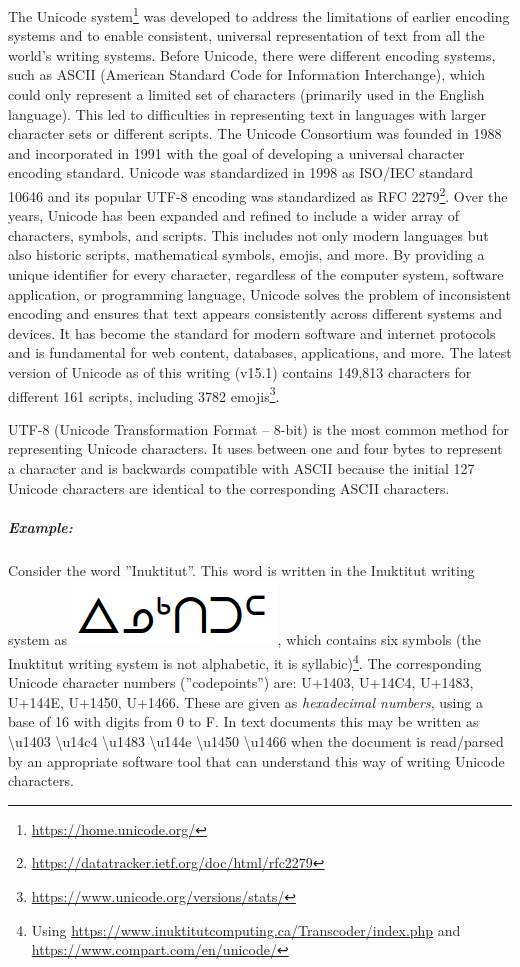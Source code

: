 The Unicode system\footnote{\url{https://home.unicode.org/}} was developed to address the limitations of earlier encoding systems and to enable consistent, universal representation of text from all the world's writing systems. Before Unicode, there were different encoding systems, such as ASCII (American Standard Code for Information Interchange), which could only represent a limited set of characters (primarily used in the English language). This led to difficulties in representing text in languages with larger character sets or different scripts. The Unicode Consortium was founded in 1988 and incorporated in 1991 with the goal of developing a universal character encoding standard. Unicode was standardized in 1998 as ISO/IEC standard 10646 and its popular UTF-8 encoding was standardized as RFC 2279\footnote{\url{https://datatracker.ietf.org/doc/html/rfc2279}}. Over the years, Unicode has been expanded and refined to include a wider array of characters, symbols, and scripts. This includes not only modern languages but also historic scripts, mathematical symbols, emojis, and more. By providing a unique identifier for every character, regardless of the computer system, software application, or programming language, Unicode solves the problem of inconsistent encoding and ensures that text appears consistently across different systems and devices. It has become the standard for modern software and internet protocols and  is fundamental for web content, databases, applications, and more. The latest version of Unicode as of this writing (v15.1) contains 149,813 characters for different 161 scripts, including 3782 emojis\footnote{\url{https://www.unicode.org/versions/stats/}}. 

UTF-8 (Unicode Transformation Format -- 8-bit) is the most common method for representing Unicode characters. It uses between one and four bytes to represent a character and is backwards compatible with ASCII because the initial 127 Unicode characters are identical to the corresponding ASCII characters. 

\subparagraph*{Example:} Consider the word ''Inuktitut''. This word is written in the Inuktitut writing system as \includegraphics[height=1.5\fontcharht\font`\B]{screen2.png}, which contains six symbols (the Inuktitut writing system is not alphabetic, it is syllabic)\footnote{Using \url{https://www.inuktitutcomputing.ca/Transcoder/index.php} and \url{https://www.compart.com/en/unicode/}}. The corresponding Unicode character numbers (''codepoints'') are: U+1403, U+14C4, U+1483, U+144E, U+1450, U+1466. These are given as \emph{hexadecimal numbers}, using a base of 16 with digits from 0 to F. In text documents this may be written as \textbackslash u1403 \textbackslash u14c4 \textbackslash u1483 \textbackslash u144e \textbackslash u1450 \textbackslash u1466 when the document is read/parsed by an appropriate software tool that can understand this way of writing Unicode characters. 

